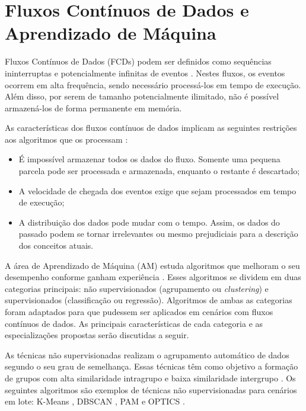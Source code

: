 \documentclass[msc, classic, a4paper]{ufbathesis}
\begin{document}
\section{Fluxos Contínuos de Dados e Aprendizado de Máquina}
\label{sec:fluxos_continuos_am}

Fluxos Contínuos de Dados (FCDs) podem ser definidos como sequências ininterruptas e potencialmente infinitas de eventos \cite{Aggarwal:2006:DSM:1196418}.
%
Nestes fluxos, os eventos ocorrem em alta frequência, sendo necessário processá-los em tempo de execução.
%
Além disso, por serem de tamanho potencialmente ilimitado, não é possível armazená-los de forma permanente em memória.
%

As características dos fluxos contínuos de dados implicam as seguintes restrições aos algoritmos que os processam \cite{bifet2009data}:
%
\begin{itemize}
    \item É impossível armazenar todos os dados do fluxo. Somente uma pequena parcela pode ser processada e armazenada, enquanto o restante é descartado;
    \item A velocidade de chegada dos eventos exige que sejam processados em tempo de execução;
    \item A distribuição dos dados pode mudar com o tempo. Assim, os dados do passado podem se tornar irrelevantes ou mesmo prejudiciais para a descrição dos conceitos atuais.
\end{itemize}

A área de Aprendizado de Máquina (AM) estuda algoritmos que melhoram o seu desempenho conforme ganham experiência \cite{Mitchell:1997:ML:541177}.
%
Esses algoritmos se dividem em duas categorias principais:
%
não supervisionados (agrupamento ou \textit{clustering}) e supervisionados (classificação ou regressão).
%
Algoritmos de ambas as categorias foram adaptados para que pudessem ser aplicados em cenários com fluxos contínuos de dados.
%
As principais características de cada categoria e as especializações propostas serão discutidas a seguir.

As técnicas não supervisionadas realizam o agrupamento automático de dados segundo o seu grau de semelhança.
Essas técnicas têm como objetivo a formação de grupos com alta similaridade intragrupo e baixa similaridade intergrupo \cite{Jain:1988:ACD:46712}.
Os seguintes algoritmos são exemplos de técnicas não supervisionadas para cenários em lote:
K-Means \cite{Lloyd:2006:LSQ:2263356.2269955},
DBSCAN \cite{Ester:1996:DAD:3001460.3001507},
PAM \cite{kaufman:clustering1990} e
OPTICS \cite{Ankerst:1999:OOP:304181.304187}.
\end{document}
